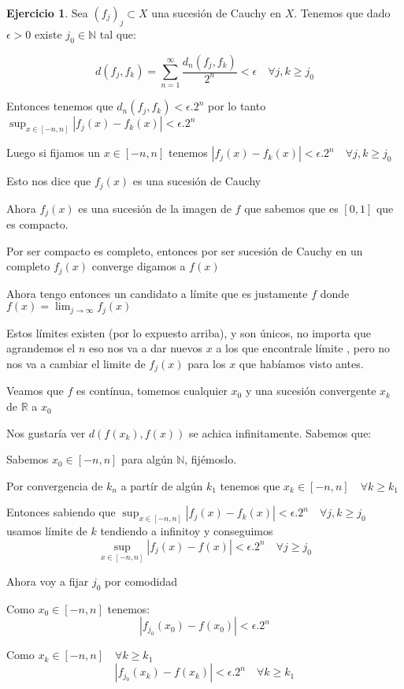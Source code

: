 \documentclass[12pt]{article}
\newcommand{\R}{\mathbb{R}}
\newcommand{\N}{\mathbb{N}}
\newcommand{\ra}{\rightarrow}
\theoremstyle{definition}
\newtheorem{ej}{Ejercicio}
\begin{document}
\begin{ej}
	Sea $(f_j)_j \subset X$ una sucesión de Cauchy en $X$. Tenemos que dado $\epsilon >0 $ existe $j_0 \in \N$ tal que:

	$$d(f_j,f_k) = \sum_{n=1}^{\infty} \frac{d_n(f_j,f_k)}{2^n} < \epsilon \quad \forall j,k \geq j_0$$

	Entonces tenemos que $d_n(f_j,f_k) < \epsilon.2^n$ por lo tanto $\sup_{x \in [-n,n]} |f_j(x)-f_k(x)| < \epsilon.2^n$

	Luego si fijamos un $x\in [-n,n]$ tenemos $|f_j(x)-f_k(x)| < \epsilon.2^n \quad \forall j,k\geq j_0 $

	Esto nos dice que $f_j(x)$ es una sucesión de Cauchy

	Ahora $f_j(x)$ es una sucesión de la imagen de $f$ que sabemos que es $[0,1]$ que es compacto.

	Por ser compacto es completo, entonces por ser sucesión de Cauchy en un completo $f_j(x)$ converge digamos a $f(x)$

	Ahora tengo entonces un candidato a límite que es justamente $f$ donde $f(x) = \lim_{j\ra\infty}f_j(x)$

	Estos límites existen (por lo expuesto arriba), y son únicos, no importa que agrandemos el $n$ eso nos va a dar nuevos $x$ a los que encontrale límite , pero no nos va a cambiar el limite de $f_j(x)$ para los $x$ que habíamos visto antes.

	Veamos que $f$ es contínua, tomemos cualquier $x_0$ y una sucesión convergente $x_k$ de $\R$ a $x_0$

	Nos gustaría ver $d(f(x_k),f(x))$ se achica infinitamente. Sabemos que:


	Sabemos $x_0 \in [-n,n]$ para algún $\N$, fijémoslo. 

	Por convergencia de $k_n$ a partír de algún $k_1$ tenemos que $x_k \in [-n,n] \quad \forall k \geq k_1$

	Entonces sabiendo que $\sup_{x \in [-n,n] } |f_j(x)-f_k(x)| <\epsilon.2^n \quad \forall j,k \geq j_0 $ usamos límite de $k$ tendiendo a infinitoy y conseguimos  
	$$\sup_{x\in[-n,n]} |f_j(x) - f(x)| < \epsilon.2^n \quad \forall j\geq j_0$$

	Ahora voy a fijar $j_0$ por comodidad

	Como $x_0 \in [-n,n] $ tenemos:
	$$ |f_{j_0}(x_0) - f(x_0)| < \epsilon. 2^n $$

	Como  $x_k \in [-n,n]\quad \forall k\geq k_1$  
	$$|f_{j_0}(x_k)-f(x_k)| < \epsilon .2^n \quad \forall k \geq k_1$$


\end{ej}
\end{document}
